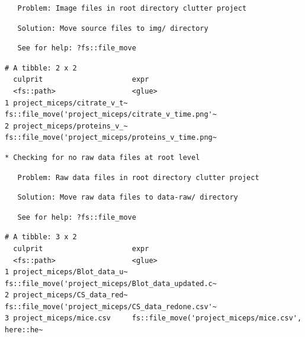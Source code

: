 \documentclass[12pt,twoside]{reedthesis}
\begin{document}
\begin{verbatim}
   Problem: Image files in root directory clutter project
\end{verbatim}
\begin{verbatim}
   Solution: Move source files to img/ directory
\end{verbatim}
\begin{verbatim}
   See for help: ?fs::file_move
\end{verbatim}
\begin{verbatim}
# A tibble: 2 x 2
  culprit                     expr                                              
  <fs::path>                  <glue>                                            
1 project_miceps/citrate_v_t~ fs::file_move('project_miceps/citrate_v_time.png'~
2 project_miceps/proteins_v_~ fs::file_move('project_miceps/proteins_v_time.png~
\end{verbatim}
\begin{verbatim}
* Checking for no raw data files at root level
\end{verbatim}
\begin{verbatim}
   Problem: Raw data files in root directory clutter project
\end{verbatim}
\begin{verbatim}
   Solution: Move raw data files to data-raw/ directory
\end{verbatim}
\begin{verbatim}
   See for help: ?fs::file_move
\end{verbatim}
\begin{verbatim}
# A tibble: 3 x 2
  culprit                     expr                                              
  <fs::path>                  <glue>                                            
1 project_miceps/Blot_data_u~ fs::file_move('project_miceps/Blot_data_updated.c~
2 project_miceps/CS_data_red~ fs::file_move('project_miceps/CS_data_redone.csv'~
3 project_miceps/mice.csv     fs::file_move('project_miceps/mice.csv', here::he~
\end{verbatim}
\normalsize
\end{document}
